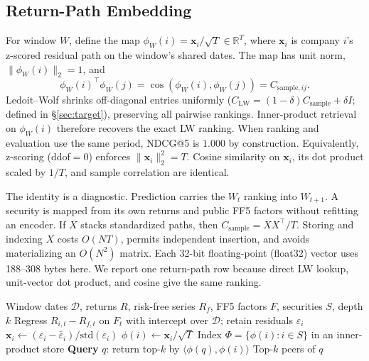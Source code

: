 \documentclass[sigconf,anonymous]{acmart}
\begin{document}
\subsection{Return-Path Embedding}
\label{sec:rawz}

For window $W$, define the map
$\phi_W(i)=\mathbf{x}_i/\sqrt{T}\in\mathbb{R}^T$, where $\mathbf{x}_i$
is company $i$'s z-scored residual path on the window's shared dates.
The map has unit norm, $\|\phi_W(i)\|_2=1$, and
\begin{equation}
  \phi_W(i)^\top\phi_W(j)
  = \cos(\phi_W(i),\phi_W(j))
  = C_{\mathrm{sample},ij}.
  \label{eq:rawz}
\end{equation}
Ledoit--Wolf shrinks off-diagonal entries uniformly
($C_{\mathrm{LW}} = (1-\delta)C_{\mathrm{sample}} + \delta I$; defined in \S\ref{sec:target}),
preserving all pairwise rankings.
Inner-product retrieval on $\phi_W(i)$ therefore recovers the exact LW ranking.
When ranking and evaluation use the same period, NDCG@5 is $1.000$ by
construction.
Equivalently, z-scoring (ddof$=0$) enforces
$\|\mathbf{x}_i\|_2^2=T$.  Cosine similarity on $\mathbf{x}_i$, its dot product
scaled by $1/T$, and sample correlation are identical.

The identity is a diagnostic.  Prediction carries the $W_t$ ranking into
$W_{t+1}$.  A security is mapped from its own returns and public FF5 factors
without refitting an encoder.  If $X$ stacks standardized paths, then
$C_{\mathrm{sample}}=XX^\top/T$.  Storing and indexing $X$ costs $O(NT)$,
permits independent insertion, and avoids materializing an $O(N^2)$ matrix.
Each 32-bit floating-point (float32) vector uses 188--308 bytes here.  We report
one return-path row because direct LW lookup, unit-vector dot product, and cosine
give the same ranking.

\begin{algorithm}[t]
\caption{Return-path embedding: construction and retrieval.
No parameters are learned; the inner product in step~6 equals the sample
residual correlation.}
\label{alg:retpath}
\begin{algorithmic}[1]
\REQUIRE Window dates $\mathcal{D}$, returns $R$, risk-free series $R_f$, FF5 factors $F$, securities $S$, depth $k$
  \STATE Regress $R_{i,t}-R_{f,t}$ on $F_t$ with intercept over $\mathcal{D}$; retain residuals $\varepsilon_i$
  \STATE $\mathbf{x}_i \leftarrow (\varepsilon_i - \bar\varepsilon_i) / \mathrm{std}(\varepsilon_i)$ 
  \STATE $\phi(i) \leftarrow \mathbf{x}_i / \sqrt{T}$ 
\ENDFOR
\STATE Index $\Phi = \{\phi(i) : i \in S\}$ in an inner-product store
\STATE \textbf{Query} $q$: return top-$k$ by $\langle\phi(q),\phi(i)\rangle$
\ENSURE Top-$k$ peers of $q$
\end{algorithmic}
\end{algorithm}
\end{document}
